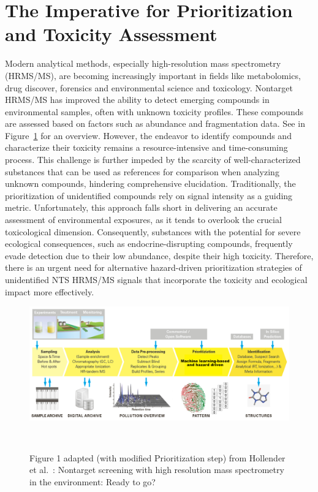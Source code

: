 \section{The Imperative for Prioritization and Toxicity Assessment}

Modern analytical methods, especially high-resolution mass spectrometry (HRMS/MS), are becoming increasingly important in fields like metabolomics, drug discover, forensics and environmental science and toxicology. Nontarget HRMS/MS has improved the ability to detect emerging compounds in environmental samples, often with unknown toxicity profiles. These compounds are assessed based on factors such as abundance and fragmentation data. See in Figure~\ref{fig:non_target_high_resolution_mass_spectrometry} for an overview. However, the endeavor to identify compounds and characterize their toxicity remains a resource-intensive and time-consuming process. This challenge is further impeded by the scarcity of well-characterized substances that can be used as references for comparison when analyzing unknown compounds, hindering comprehensive elucidation. Traditionally, the prioritization of unidentified compounds rely on signal intensity as a guiding metric. Unfortunately, this approach falls short in delivering an accurate assessment of environmental exposures, as it tends to overlook the crucial toxicological dimension. Consequently, substances with the potential for severe ecological consequences, such as endocrine-disrupting compounds, frequently evade detection due to their low abundance, despite their high toxicity. Therefore, there is an urgent need for alternative hazard-driven prioritization strategies of unidentified NTS HRMS/MS signals that incorporate the toxicity and ecological impact more effectively.

\begin{figure}[htbp]  %
    \centering
    \includegraphics[width=1.0\textwidth]{figures/non_target_high_resolution_mass_spectrometry_1.png}  
    \caption{Figure 1 adapted (with modified Prioritization step) from Hollender et al.~\cite{hollender}: Nontarget screening with high resolution mass spectrometry in the environment: Ready to go? }
~\label{fig:non_target_high_resolution_mass_spectrometry} 
\end{figure}

